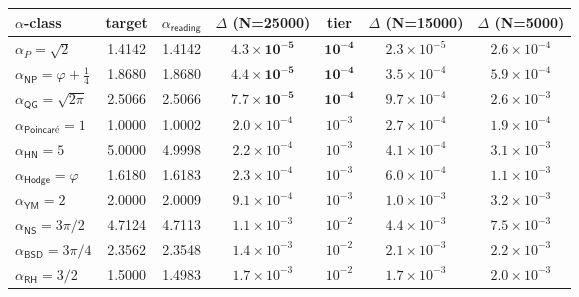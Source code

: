 \documentclass[11pt,a4paper]{amsart}
\theoremstyle{plain}
\theoremstyle{definition}
\begin{document}
\begin{center}
\begin{tabular}{lcccccc}
\toprule
$\alpha$-class & target & $\alpha_{\textsf{reading}}$ & $\Delta$ (N=25000) & tier & $\Delta$ (N=15000) & $\Delta$ (N=5000) \\
\midrule
$\alpha_P = \sqrt{2}$ & 1.4142 & 1.4142 & $\mathbf{4.3\times 10^{-5}}$ & $\mathbf{10^{-4}}$ & $2.3\times 10^{-5}$ & $2.6\times 10^{-4}$ \\
$\alpha_{\textsf{NP}} = \varphi + \tfrac{1}{4}$ & 1.8680 & 1.8680 & $\mathbf{4.4\times 10^{-5}}$ & $\mathbf{10^{-4}}$ & $3.5\times 10^{-4}$ & $5.9\times 10^{-4}$ \\
$\alpha_{\textsf{QG}} = \sqrt{2\pi}$ & 2.5066 & 2.5066 & $\mathbf{7.7\times 10^{-5}}$ & $\mathbf{10^{-4}}$ & $9.7\times 10^{-4}$ & $2.6\times 10^{-3}$ \\
$\alpha_{\textsf{Poincar\'e}} = 1$ & 1.0000 & 1.0002 & $2.0\times 10^{-4}$ & $10^{-3}$ & $2.7\times 10^{-4}$ & $1.9\times 10^{-4}$ \\
$\alpha_{\textsf{HN}} = 5$ & 5.0000 & 4.9998 & $2.2\times 10^{-4}$ & $10^{-3}$ & $4.1\times 10^{-4}$ & $3.1\times 10^{-3}$ \\
$\alpha_{\textsf{Hodge}} = \varphi$ & 1.6180 & 1.6183 & $2.3\times 10^{-4}$ & $10^{-3}$ & $6.0\times 10^{-4}$ & $1.1\times 10^{-3}$ \\
$\alpha_{\textsf{YM}} = 2$ & 2.0000 & 2.0009 & $9.1\times 10^{-4}$ & $10^{-3}$ & $1.0\times 10^{-3}$ & $3.2\times 10^{-3}$ \\
$\alpha_{\textsf{NS}} = 3\pi/2$ & 4.7124 & 4.7113 & $1.1\times 10^{-3}$ & $10^{-2}$ & $4.4\times 10^{-3}$ & $7.5\times 10^{-3}$ \\
$\alpha_{\textsf{BSD}} = 3\pi/4$ & 2.3562 & 2.3548 & $1.4\times 10^{-3}$ & $10^{-2}$ & $2.1\times 10^{-3}$ & $2.2\times 10^{-3}$ \\
$\alpha_{\textsf{RH}} = 3/2$ & 1.5000 & 1.4983 & $1.7\times 10^{-3}$ & $10^{-2}$ & $1.7\times 10^{-3}$ & $2.0\times 10^{-3}$ \\
\bottomrule
\end{tabular}
\end{center}
\end{document}

